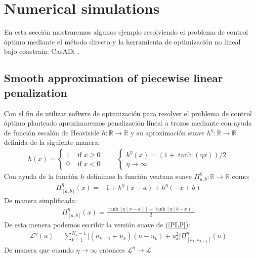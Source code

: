 \section{Numerical simulations}\label{Section5}

En esta sección mostraremos algunos ejemplo resolviendo el problema de control óptimo mediante el método directo y la herramienta de optimización no lineal bajo constrain: CasADi \cite{Andersson2019}.
%
\subsection{Smooth approximation of piecewise linear penalization}

Con el fin de utilizar softwre de optimización para resolver el problema de control óptimo planteado aproximaremos penalización lineal a trozos mediante con ayuda de función escalón de Heaviside $h:\mathbb{R} \rightarrow \mathbb{R}$ y su aproximación suave $h^\eta:\mathbb{R} \rightarrow \mathbb{R}$ definida de la siguiente manera: 
\begin{gather}
    h(x) = \begin{cases}
        1 & \text{ if } x \geq 0 \\
        0 & \text{ if } x < 0
    \end{cases}    
    \hspace{2em} 
    \begin{cases}
        h^\eta(x) = (1 + \tanh(\eta x))/2   \\
        \eta \rightarrow \infty
    \end{cases}
\end{gather}
Con ayuda de la función $h$ definimos la función ventana suave $\Pi_{a,b}^\eta:\mathbb{R} \rightarrow \mathbb{R}$ como:
\begin{gather}
    \Pi_{[a,b]}^\eta(x) = - 1 + h^\eta(x-a) + h^\eta(-x+b) 
\end{gather}
De manera simplificada: 
\begin{gather}
    \Pi_{[a,b]}^\eta(x) = \frac{\tanh[\eta( x -a)] + \tanh[\eta (b-x)]}{2}
\end{gather}
De esta menera podemos escribir la versión  suave de (\ref{PLP}):
\begin{gather}
    \mathcal{L}^\eta(u) = \sum_{k = 1}^{N_u-1} \big[ (u_{k+1}+u_{k}) (u-u_k) + u_k^2 \big] \Pi^\eta_{[u_k,u_{k+1}]}(u)
\end{gather}
De manera que cuando $\eta \rightarrow \infty$ entonces $\mathcal{L}^\eta \rightarrow \mathcal{L}$

